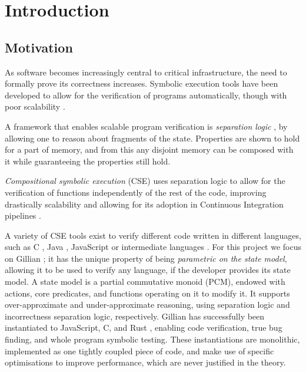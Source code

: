 \chapter{Introduction}

\section{Motivation}

As software becomes increasingly central to critical infrastructure, the need to formally prove its correctness increases. Symbolic execution tools have been developed to allow for the verification of programs automatically, though with poor scalability \cite{surveysymex}.

A framework that enables scalable program verification is \emph{separation logic} \cite{seplogic1,seplogic2}, by allowing one to reason about fragments of the state. Properties are shown to hold for a part of memory, and from this any disjoint memory can be composed with it while guaranteeing the properties still hold.

\emph{Compositional symbolic execution} (CSE) uses separation logic to allow for the verification of functions independently of the rest of the code, improving drastically scalability \cite{pathexplo} and allowing for its adoption in Continuous Integration pipelines \cite{pulse}.

A variety of CSE tools exist to verify different code written in different languages, such as C \cite{verifast,infer,pulse}, Java \cite{jstar,verifast,infer,pulse}, JavaScript \cite{javert1} or intermediate languages \cite{corestar,viper,gillian0}. For this project we focus on Gillian \cite{gillian1,gillian2}; it has the unique property of being \emph{parametric on the state model}, allowing it to be used to verify any language, if the developer provides its state model. A state model is a partial commutative monoid (PCM), endowed with actions, core predicates, and functions operating on it to modify it. It supports over-approximate and under-approximate reasoning, using separation logic and incorrectness separation logic, respectively. Gillian has successfully been instantiated to JavaScript, C, and Rust \cite{gillian0,gillianrust}, enabling code verification, true bug finding, and whole program symbolic testing. These instantiations are monolithic, implemented as one tightly coupled piece of code, and make use of specific optimisations to improve performance, which are never justified in the theory.

